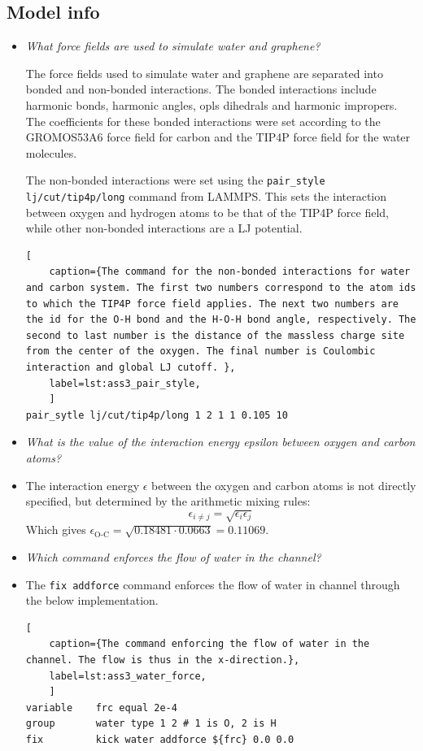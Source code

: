 \documentclass[10pt,a4paper]{labreport}
\begin{document}
\subsection{Model info}
\begin{itemize}
  \item \textit{What force fields are used to simulate water and graphene?}
  
  The force fields used to simulate water and graphene are separated into bonded and non-bonded interactions. 
  The bonded interactions include harmonic bonds, harmonic angles, opls dihedrals and harmonic impropers. The coefficients for these bonded interactions were set according to the GROMOS53A6 force field for carbon and the TIP4P force field for the water molecules. 

  The non-bonded interactions were set using the \texttt{pair\_style  lj/cut/tip4p/long} command from LAMMPS. This sets the interaction between oxygen and hydrogen atoms to be that of the TIP4P force field, while other non-bonded interactions are a LJ potential. 
 
  \begin{lstlisting}[ 
    caption={The command for the non-bonded interactions for water and carbon system. The first two numbers correspond to the atom ids to which the TIP4P force field applies. The next two numbers are the id for the O-H bond and the H-O-H bond angle, respectively. The second to last number is the distance of the massless charge site from the center of the oxygen. The final number is Coulombic interaction and global LJ cutoff. },
    label=lst:ass3_pair_style,
    ]
pair_sytle lj/cut/tip4p/long 1 2 1 1 0.105 10
\end{lstlisting}

  \item \textit{What is the value of the interaction energy epsilon between oxygen and carbon atoms?}
  \item 
  The interaction energy $\epsilon$ between the oxygen and carbon atoms is not directly specified, but determined by the arithmetic mixing rules:
  \begin{equation}
    \epsilon_{i\neq j} =  \sqrt{\epsilon_i\epsilon_j}
  \end{equation}
  Which gives $\epsilon_\text{O-C} = \sqrt{0.18481 \cdot 0.0663} = 0.11069$. 
  \item \textit{Which command enforces the flow of water in the channel?}
  \item 
  The \texttt{fix addforce} command enforces the flow of water in channel through the below implementation.
    \begin{lstlisting}[ 
    caption={The command enforcing the flow of water in the channel. The flow is thus in the x-direction.},
    label=lst:ass3_water_force,
    ]
variable    frc equal 2e-4
group       water type 1 2 # 1 is O, 2 is H
fix         kick water addforce ${frc} 0.0 0.0
\end{lstlisting}
  
\end{itemize}
\newpage 
\end{document}
